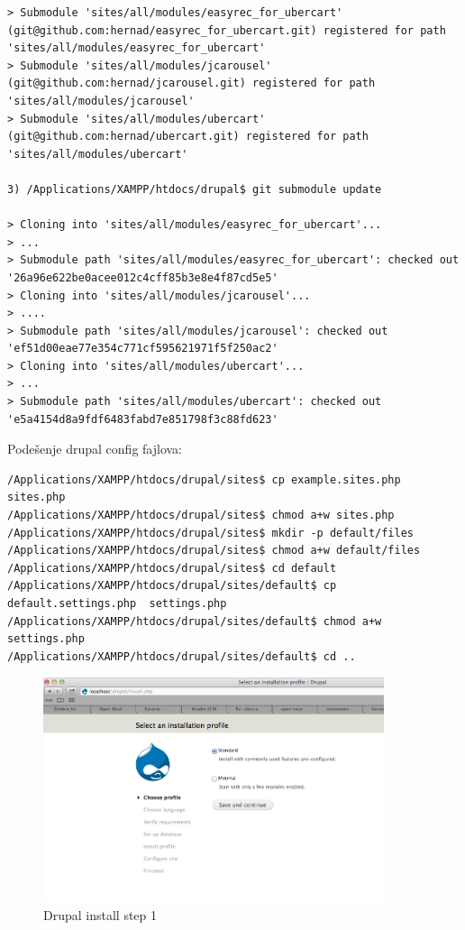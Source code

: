 \documentclass[times, utf8, seminar]{fit}
\begin{document}
{{{\begin{lstlisting}
> Submodule 'sites/all/modules/easyrec_for_ubercart' (git@github.com:hernad/easyrec_for_ubercart.git) registered for path 'sites/all/modules/easyrec_for_ubercart'
> Submodule 'sites/all/modules/jcarousel' (git@github.com:hernad/jcarousel.git) registered for path 'sites/all/modules/jcarousel'
> Submodule 'sites/all/modules/ubercart' (git@github.com:hernad/ubercart.git) registered for path 'sites/all/modules/ubercart'

3) /Applications/XAMPP/htdocs/drupal$ git submodule update

> Cloning into 'sites/all/modules/easyrec_for_ubercart'...
> ...
> Submodule path 'sites/all/modules/easyrec_for_ubercart': checked out '26a96e622be0acee012c4cff85b3e8e4f87cd5e5'
> Cloning into 'sites/all/modules/jcarousel'...
> ....
> Submodule path 'sites/all/modules/jcarousel': checked out 'ef51d00eae77e354c771cf595621971f5f250ac2'
> Cloning into 'sites/all/modules/ubercart'...
> ...
> Submodule path 'sites/all/modules/ubercart': checked out 'e5a4154d8a9fdf6483fabd7e851798f3c88fd623'
\end{lstlisting}

Podešenje drupal config fajlova:

\begin{lstlisting}
/Applications/XAMPP/htdocs/drupal/sites$ cp example.sites.php sites.php
/Applications/XAMPP/htdocs/drupal/sites$ chmod a+w sites.php
/Applications/XAMPP/htdocs/drupal/sites$ mkdir -p default/files
/Applications/XAMPP/htdocs/drupal/sites$ chmod a+w default/files
/Applications/XAMPP/htdocs/drupal/sites$ cd default
/Applications/XAMPP/htdocs/drupal/sites/default$ cp default.settings.php  settings.php
/Applications/XAMPP/htdocs/drupal/sites/default$ chmod a+w settings.php
/Applications/XAMPP/htdocs/drupal/sites/default$ cd ..
\end{lstlisting}

\begin{figure}[H]
\centering
\includegraphics[width=10cm]{img/drupal_install_1.png}
\caption{Drupal install step 1}
\end{figure}

}}}
\end{document}
